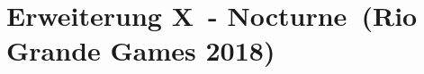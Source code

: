 \renewcommand{\cardcolor}{nocturne}
\renewcommand{\cardextension}{Erweiterung X}
\renewcommand{\cardextensiontitle}{Nocturne}
\renewcommand{\seticon}{empty.png}

\clearpage
\newpage
\section{\cardextension \ - \cardextensiontitle \ (Rio Grande Games 2018)}


\hspace{-0.6cm}
